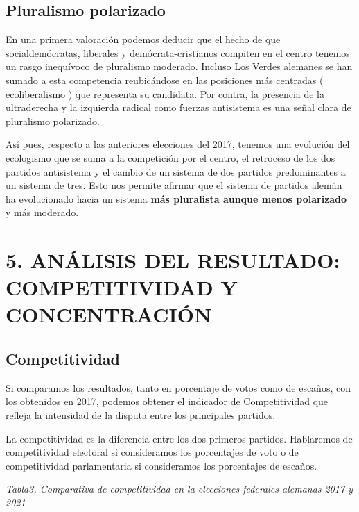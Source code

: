 \documentclass[
]{article}
\begin{document}
\hypertarget{pluralismo-polarizado}{%
\subsection{Pluralismo polarizado}\label{pluralismo-polarizado}}

En una primera valoración podemos deducir que el hecho de que
socialdemócratas, liberales y demócrata-cristianos compiten en el centro
tenemos un rasgo inequívoco de pluralismo moderado. Incluso Los Verdes
alemanes se han sumado a esta competencia reubicándose en las posiciones
más centradas ( ecoliberalismo ) que representa su candidata. Por
contra, la presencia de la ultraderecha y la izquierda radical como
fuerzas antisistema es una señal clara de pluralismo polarizado.

Así pues, respecto a las anteriores elecciones del 2017, tenemos una
evolución del ecologismo que se suma a la competición por el centro, el
retroceso de los dos partidos antisistema y el cambio de un sistema de
dos partidos predominantes a un sistema de tres. Esto nos permite
afirmar que el sistema de partidos alemán ha evolucionado hacia un
sistema \textbf{más pluralista aunque menos polarizado} y más moderado.

\hypertarget{anuxe1lisis-del-resultado-competitividad-y-concentraciuxf3n}{%
\section{5. ANÁLISIS DEL RESULTADO: COMPETITIVIDAD Y
CONCENTRACIÓN}\label{anuxe1lisis-del-resultado-competitividad-y-concentraciuxf3n}}

\hypertarget{competitividad}{%
\subsection{Competitividad}\label{competitividad}}

Si comparamos los resultados, tanto en porcentaje de votos como de
escaños, con los obtenidos en 2017, podemos obtener el indicador de
Competitividad que refleja la intensidad de la disputa entre los
principales partidos.

La competitividad es la diferencia entre los dos primeros partidos.
Hablaremos de competitividad electoral si consideramos los porcentajes
de voto o de competitividad parlamentaria si consideramos los
porcentajes de escaños.

\emph{Tabla3. Comparativa de competitividad en la elecciones federales
alemanas 2017 y 2021}
\end{document}
